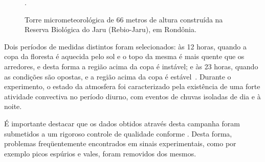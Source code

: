 \begin{figure}[ht]
	\caption{Torre micrometeorológica de $66$ metros de altura construída na Reserva Biológica do Jaru (Rebio-Jaru), em Rondônia.}
	\vspace{6mm}	%
	\begin{center}
	\end{center}
	\vspace{2mm}	%
	. 	%
	\label{figtorre}
\end{figure}

Dois períodos de medidas distintos foram selecionados: às 12 horas, quando a copa da floresta é aquecida pelo sol e o topo da mesma é mais quente que os arredores, e desta forma a região acima da copa é instável; e às 23 horas, quando as condições são opostas, e a região acima da copa é estável~\cite{Ramos/04}. Durante o experimento, o estado da atmosfera foi caracterizado pela existência de uma forte atividade convectiva no período diurno, com eventos de chuvas isoladas de dia e à noite.

É importante destacar que os dados obtidos através desta campanha foram submetidos a um rigoroso controle de qualidade conforme . Desta forma, problemas freqüentemente encontrados em sinais experimentais, como por exemplo picos espúrios e vales, foram removidos dos mesmos.